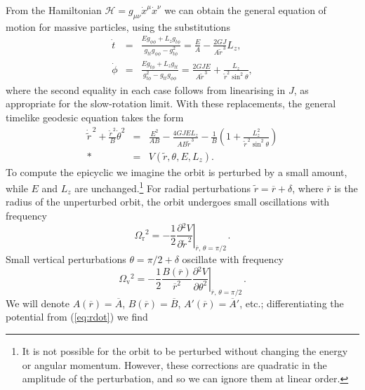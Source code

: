 \documentclass[aps,prd,amsfonts,amssymb,amsmath,nofootinbib,reprint,showpacs]{revtex4-1}
\newcommand{\eqnref}[1]{(\ref{eq:#1})}
\newcommand{\sub}[1]{\ensuremath{_\text{#1}}}
\newcommand{\partialdiff}[2]{\ensuremath{\frac{\partial {#1}}{\partial {#2}}}}
\newcommand{\recip}[1]{\ensuremath{\frac{1}{#1}}}
\begin{document}
From the Hamiltonian $\mathcal{H} = g_{\mu\nu}\dot{x}^\mu\dot{x}^\nu$ we can obtain the general equation of motion for massive particles, using the substitutions
\begin{eqnarray}
\dot{t} & = & \frac{Eg_{\phi\phi}+L_z g_{t\phi}}{g_{tt}g_{\phi\phi} -g_{t\phi}^2} = \frac{E}{A} -\frac{2GJ}{A\widetilde{r}^{\,3}}L_z, \\
\dot{\phi} & = &  \frac{Eg_{t\phi}+L_z g_{tt}}{g_{t\phi}^2-g_{tt}g_{\phi\phi}} = \frac{2GJE}{A\widetilde{r}^{\,3}} + \frac{L_z}{\widetilde{r}^2 \sin^2\theta},
\end{eqnarray}
where the second equality in each case follows from linearising in $J$, as appropriate for the slow-rotation limit. With these replacements, the general timelike geodesic equation takes the form
\begin{eqnarray}
\dot{\widetilde{r}}^{\,2} + \frac{\widetilde{r}^{\,2}}{B} \dot{\theta}^2 & = & \frac{E^2}{AB} -\frac{4GJEL_z}{AB \widetilde{r}^{\,3}}- \recip{B}\left(1 + \frac{L_z^2}{\widetilde{r}^{\,2}\sin^2\theta}\right) \nonumber \\*
 & = & V(\widetilde{r},\theta,E,L_z).
\label{eq:rdot}
\end{eqnarray}
To compute the epicyclic we imagine the orbit is perturbed by a small amount, while $E$ and $L_z$ are unchanged.\footnote{It is not possible for the orbit to be perturbed without changing the energy or angular momentum. However, these corrections are quadratic in the amplitude of the perturbation, and so we can ignore them at linear order.} For radial perturbations $\widetilde{r} = \overline{r} + \delta$, where $\overline{r}$ is the radius of the unperturbed orbit, the orbit undergoes small oscillations with frequency
\begin{equation}
\Omega\sub{r}^2 = -\recip{2} \left. \partialdiff{^2 V}{\widetilde{r}^{\,2}}\right|_{\overline{r},\,\theta=\pi/2\,} .
\end{equation}
Small vertical perturbations $\theta = \pi/2 + \delta$ oscillate with frequency
\begin{equation}
\Omega\sub{v}^2 = -\recip{2} \frac{B(\overline{r})}{\overline{r}^2} \left. \partialdiff{^2 V}{\theta^2}\right|_{\overline{r},\,\theta=\pi/2\,} .
\end{equation}
We will denote $A(\overline{r}) = \overline{A}$, $B(\overline{r}) = \overline{B}$, $A'(\overline{r}) = \overline{A}'$, etc.; differentiating the potential from \eqnref{rdot} we find
\end{document}
